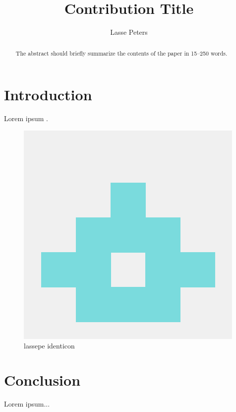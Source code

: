 \documentclass{article}
\begin{document}
%
\title{Contribution Title}
\author{Lasse Peters}

\maketitle
%
\begin{abstract}
The abstract should briefly summarize the contents of the paper in
15--250 words.
\end{abstract}

\section{Introduction}

Lorem ipsum \cite{lowry1951protein}.

\begin{figure}
  \centering
  \includegraphics[width=0.8\linewidth]{lassepe.png}
  \caption{lassepe identicon}%
  \label{fig:lassepe-ident}
\end{figure}

\section{Conclusion}

Lorem ipsum...

\printbibliography
\end{document}
